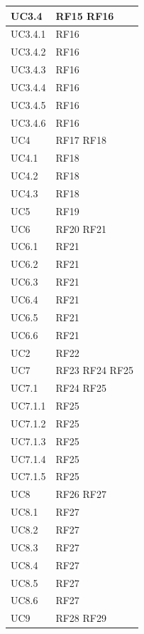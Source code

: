 \documentclass[10pt]{article}
\begin{document}
\begin{justify}
\begin{center}
\begin{longtable}{|>{\vspace{5pt}}C{2.7cm}<{\vspace{5pt}}|>{\vspace{5pt}}C{2.7cm}<{\vspace{5pt}}|}
\hline
UC3.4 & RF15 \linebreak RF16\\
\hline
UC3.4.1 & RF16\\
\hline
UC3.4.2 & RF16\\
\hline
UC3.4.3 & RF16\\
\hline
UC3.4.4 & RF16\\
\hline
UC3.4.5 & RF16\\
\hline
UC3.4.6 & RF16\\
\hline
UC4 & RF17 \linebreak RF18\\
\hline
UC4.1 & RF18\\
\hline
UC4.2 & RF18\\
\hline
UC4.3 & RF18\\
\hline
UC5 & RF19\\
\hline
UC6 & RF20 \linebreak RF21\\
\hline
UC6.1 & RF21\\
\hline
UC6.2 & RF21\\
\hline
UC6.3 & RF21\\
\hline
UC6.4 & RF21\\
\hline
UC6.5 & RF21\\
\hline
UC6.6 & RF21\\
\hline
UC2 & RF22\\
\hline
UC7 & RF23 \linebreak RF24 \linebreak RF25\\
\hline
UC7.1 & RF24 \linebreak RF25\\
\hline
UC7.1.1 & RF25\\
\hline
UC7.1.2 & RF25\\
\hline
UC7.1.3 & RF25\\
\hline
UC7.1.4 & RF25\\
\hline
UC7.1.5 & RF25\\
\hline
UC8 & RF26 \linebreak RF27\\
\hline
UC8.1 & RF27\\
\hline
UC8.2 & RF27\\
\hline
UC8.3 & RF27\\
\hline
UC8.4 & RF27\\
\hline
UC8.5 & RF27\\
\hline
UC8.6 & RF27\\
\hline
UC9 & RF28 \linebreak RF29\\

\end{longtable}
\end{center}
\end{justify}
\end{document}
